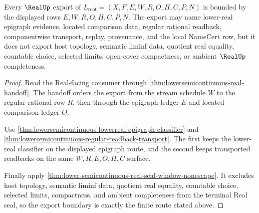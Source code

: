 \begin{theorem}
\label{thm:lowersemicontinuous-real-seal-export-boundary}
Every $\RealUp$ export of $L_{\mathrm{root}}=(X,F,E,W,R,O,H,C,P,N)$ is bounded
by the displayed rows $E,W,R,O,H,C,P,N$. The export may name lower-real
epigraph evidence, located comparison data, regular rational readback,
componentwise transport, replay, provenance, and the local NameCert row, but it
does not export host topology, semantic liminf data, quotient real equality,
countable choice, selected limits, open-cover compactness, or ambient
$\RealUp$ completeness.
\end{theorem}
\begin{proof}
Read the Real-facing consumer through
\autoref{thm:lowersemicontinuous-real-handoff}. The handoff orders the export
from the stream schedule $W$ to the regular rational row $R$, then through the
epigraph ledger $E$ and located comparison ledger $O$.

Use \autoref{thm:lowersemicontinuous-lowerreal-epigraph-classifier} and
\autoref{thm:lowersemicontinuous-regular-readback-transport}. The first keeps
the lower-real classifier on the displayed epigraph route, and the second
keeps transported readbacks on the same $W,R,E,O,H,C$ surface.

Finally apply \autoref{thm:lower-semicontinuous-real-seal-window-nonescape}. It
excludes host topology, semantic liminf data, quotient real equality, countable
choice, selected limits, compactness, and ambient completeness from the
terminal Real seal, so the export boundary is exactly the finite route stated
above.
\end{proof}

